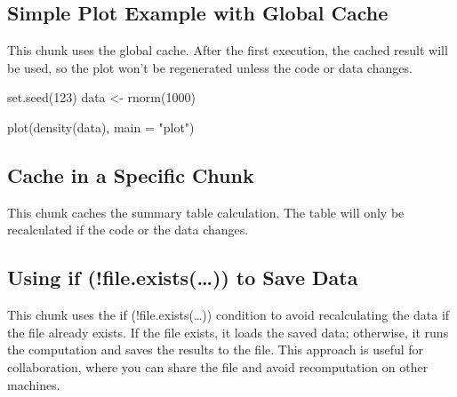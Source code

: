 \documentclass[
  journal,
]{IEEEtran}%
\newenvironment{Shaded}{\begin{snugshade}}{\end{snugshade}}
\newcommand{\AttributeTok}[1]{\textcolor[rgb]{0.40,0.45,0.13}{#1}}
\newcommand{\DecValTok}[1]{\textcolor[rgb]{0.68,0.00,0.00}{#1}}
\newcommand{\FunctionTok}[1]{\textcolor[rgb]{0.28,0.35,0.67}{#1}}
\newcommand{\NormalTok}[1]{\textcolor[rgb]{0.00,0.23,0.31}{#1}}
\newcommand{\OtherTok}[1]{\textcolor[rgb]{0.00,0.23,0.31}{#1}}
\newcommand{\StringTok}[1]{\textcolor[rgb]{0.13,0.47,0.30}{#1}}
\begin{document}
\subsection{Simple Plot Example with Global
Cache}\label{simple-plot-example-with-global-cache}

This chunk uses the global cache. After the first execution, the cached
result will be used, so the plot won't be regenerated unless the code or
data changes.

\begin{Shaded}
\begin{Highlighting}[]
\FunctionTok{set.seed}\NormalTok{(}\DecValTok{123}\NormalTok{)}
\NormalTok{data }\OtherTok{\textless{}{-}} \FunctionTok{rnorm}\NormalTok{(}\DecValTok{1000}\NormalTok{)}

\FunctionTok{plot}\NormalTok{(}\FunctionTok{density}\NormalTok{(data), }\AttributeTok{main =} \StringTok{"plot"}\NormalTok{)}
\end{Highlighting}
\end{Shaded}

\subsection{Cache in a Specific Chunk}\label{cache-in-a-specific-chunk}

This chunk caches the summary table calculation. The table will only be
recalculated if the code or the data changes.

\subsection{Using if (!file.exists(\ldots)) to Save
Data}\label{using-if-file.exists-to-save-data}

This chunk uses the if (!file.exists(\ldots)) condition to avoid
recalculating the data if the file already exists. If the file exists,
it loads the saved data; otherwise, it runs the computation and saves
the results to the file. This approach is useful for collaboration,
where you can share the file and avoid recomputation on other machines.
\end{document}

